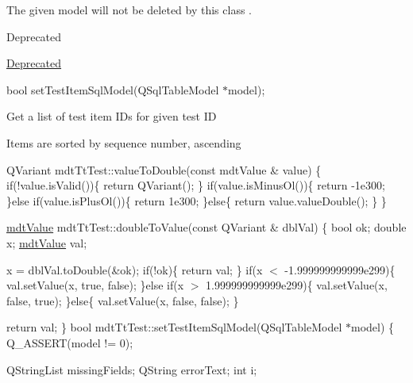 The given model will not be deleted by this class .

\begin{DoxyRefDesc}{Deprecated}
\item[\hyperlink{deprecated__deprecated000012}{Deprecated}]\end{DoxyRefDesc}
bool set\-Test\-Item\-Sql\-Model(\-Q\-Sql\-Table\-Model $\ast$model);

Get a list of test item I\-Ds for given test I\-D

Items are sorted by sequence number, ascending

Q\-Variant mdt\-Tt\-Test\-::value\-To\-Double(const mdt\-Value \& value) \{ if(!value.is\-Valid())\{ return Q\-Variant(); \} if(value.\-is\-Minus\-Ol())\{ return -\/1e300; \}else if(value.\-is\-Plus\-Ol())\{ return 1e300; \}else\{ return value.\-value\-Double(); \} \}

\hyperlink{classmdt_value}{mdt\-Value} mdt\-Tt\-Test\-::double\-To\-Value(const Q\-Variant \& dbl\-Val) \{ bool ok; double x; \hyperlink{classmdt_value}{mdt\-Value} val;

x = dbl\-Val.\-to\-Double(\&ok); if(!ok)\{ return val; \} if(x $<$ -\/1.\-999999999999e299)\{ val.\-set\-Value(x, true, false); \}else if(x $>$ 1.\-999999999999e299)\{ val.\-set\-Value(x, false, true); \}else\{ val.\-set\-Value(x, false, false); \}

return val; \} bool mdt\-Tt\-Test\-::set\-Test\-Item\-Sql\-Model(\-Q\-Sql\-Table\-Model $\ast$model) \{ Q\-\_\-\-A\-S\-S\-E\-R\-T(model != 0);

Q\-String\-List missing\-Fields; Q\-String error\-Text; int i;

